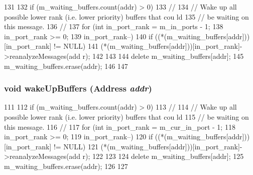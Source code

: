 \begin{DoxyCode}
131 {
132     if (m_waiting_buffers.count(addr) > 0) {
133         //
134         // Wake up all possible lower rank (i.e. lower priority) buffers that cou
      ld
135         // be waiting on this message.
136         //
137         for (int in_port_rank = m_in_ports - 1;
138              in_port_rank >= 0;
139              in_port_rank--) {
140             if ((*(m_waiting_buffers[addr]))[in_port_rank] != NULL) {
141                 (*(m_waiting_buffers[addr]))[in_port_rank]->reanalyzeMessages(add
      r);
142             }
143         }
144         delete m_waiting_buffers[addr];
145         m_waiting_buffers.erase(addr);
146     }
147 }
\end{DoxyCode}
\hypertarget{classAbstractController_aa205de64042612c18d6104532fc72024}{
\subsubsection[{wakeUpBuffers}]{\setlength{\rightskip}{0pt plus 5cm}void wakeUpBuffers ({\bf Address} {\em addr})}}
\label{classAbstractController_aa205de64042612c18d6104532fc72024}



\begin{DoxyCode}
111 {
112     if (m_waiting_buffers.count(addr) > 0) {
113         //
114         // Wake up all possible lower rank (i.e. lower priority) buffers that cou
      ld
115         // be waiting on this message.
116         //
117         for (int in_port_rank = m_cur_in_port - 1;
118              in_port_rank >= 0;
119              in_port_rank--) {
120             if ((*(m_waiting_buffers[addr]))[in_port_rank] != NULL) {
121                 (*(m_waiting_buffers[addr]))[in_port_rank]->reanalyzeMessages(add
      r);
122             }
123         }
124         delete m_waiting_buffers[addr];
125         m_waiting_buffers.erase(addr);
126     }
127 }
\end{DoxyCode}


